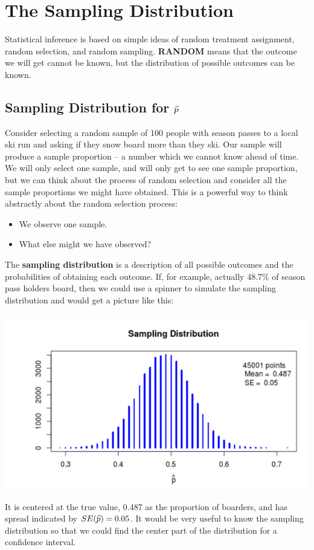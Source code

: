 \def\theTopic{Reading 7}

\section{ The Sampling Distribution}


 Statistical inference is based on simple ideas of random treatment
 assignment, random selection, and random sampling.   {\bf RANDOM} 
 means that the outcome we will get cannot be known, but the
 distribution of possible outcomes can be known. 


\subsection{ Sampling Distribution for $\widehat{p}$}

 Consider selecting a random sample of 100 people with season passes
 to a local ski run and asking if they snow board more than they ski.
 Our sample will produce a sample  proportion -- a number which we
 cannot know ahead of time.  We will only select 
 one sample, and will only get to see one sample proportion, but we
 can think about the process of random selection and consider all the
 sample proportions we might have obtained.  This is a powerful way to
 think abstractly about the random selection process:
 \begin{itemize}
 \item We observe one sample.
 \item What else might we have observed?
 \end{itemize}
  The {\bf sampling distribution} is a description of all possible
  outcomes and the probabilities of obtaining each outcome.  If, for
  example, actually 48.7\%  of season pass holders board, then we
  could use a spinner to simulate the sampling distribution and would
  get a picture like this:

  \includegraphics[width=.5\linewidth]{../plots/SampDistnofPhat-100.png}

It is centered at the true value, 0.487 as the proportion of boarders,
and has spread indicated by $SE(\widehat{p}) = 0.05$. 
It would be very useful to know the sampling distribution so that we
could find the center part of the distribution for a confidence
interval.  

